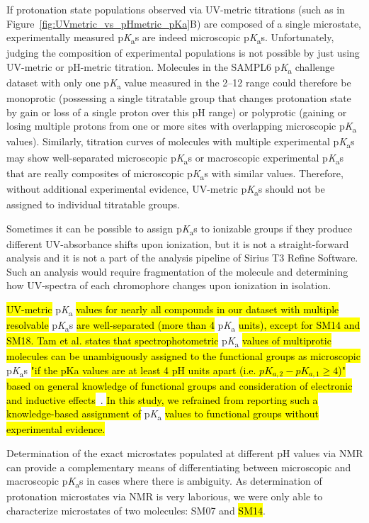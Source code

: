 \documentclass[9pt,lineno]{elife}
\newcommand{\pKa}{p\textit{K}\textsubscript{a}}
\begin{document}
If protonation state populations observed via UV-metric titrations (such as in Figure~\ref{fig:UVmetric_vs_pHmetric_pKa}B) are composed of a single microstate, experimentally measured \pKa{}s are indeed microscopic \pKa{}s.  
Unfortunately, judging the composition of experimental populations is not possible by just using UV-metric or pH-metric titration. 
Molecules in the SAMPL6 \pKa{} challenge dataset with only one \pKa{} value measured in the 2--12 range could therefore be monoprotic (possessing a single titratable group that changes protonation state by gain or loss of a single proton over this pH range) or polyprotic (gaining or losing multiple protons from one or more sites with overlapping microscopic \pKa{} values). 
Similarly, titration curves of molecules with multiple experimental \pKa{}s may show well-separated microscopic \pKa{}s or macroscopic experimental \pKa{}s that are really composites of microscopic \pKa{}s with similar values. 
Therefore, without additional experimental evidence, UV-metric \pKa{}s should not be assigned to individual titratable groups. 

Sometimes it can be possible to assign \pKa{}s to ionizable groups if they produce different UV-absorbance shifts upon ionization, but it is not a straight-forward analysis and it is not a part of the analysis pipeline of Sirius T3 Refine Software. Such an analysis would require fragmentation of the molecule and determining how UV-spectra of each chromophore changes upon ionization in isolation. 

\hl{UV-metric} \pKa{} \hl{values for nearly all compounds in our dataset with multiple resolvable} \pKa{}s \hl{are well-separated (more than 4} \pKa{} \hl{units), except for SM14 and SM18. Tam et al. states that spectrophotometric} \pKa{} \hl{values of multiprotic molecules can be unambiguously assigned to the functional groups as microscopic} \pKa{}s \hl{"if the pKa values are at least 4 pH units apart (i.e. $pK_{a,2} - pK_{a,1} \geq 4$)" based on general knowledge of functional groups and consideration of electronic and inductive effects}~\citep{tam_multi-wavelength_2001}. \hl{In this study, we refrained from reporting such a knowledge-based assignment of} \pKa{} \hl{values to functional groups without experimental evidence.}

Determination of the exact microstates populated at different pH values via NMR can provide a complementary means of differentiating between microscopic and macroscopic \pKa{}s in cases where there is ambiguity.
As determination of protonation microstates via NMR is very laborious, we were only able to characterize microstates of two molecules: SM07 and \hl{SM14}. 
\end{document}
